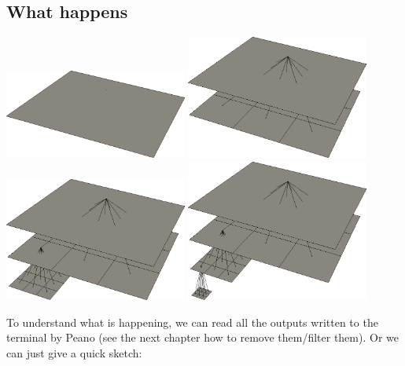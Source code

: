 \subsection{What happens}


\begin{center}
  \includegraphics[width=0.45\textwidth]{3_basics/construction00.png}
  \includegraphics[width=0.45\textwidth]{3_basics/construction01.png}
  \includegraphics[width=0.45\textwidth]{3_basics/construction02.png}
  \includegraphics[width=0.45\textwidth]{3_basics/construction03.png}
\end{center}


To understand what is happening, we can read all the outputs written to the
terminal by Peano (see the next chapter how to remove them/filter them).
Or we can just give a quick sketch:

